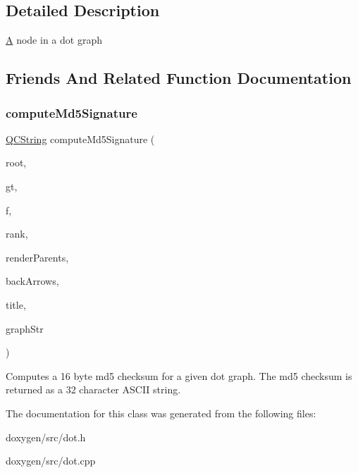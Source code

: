 \subsection{Detailed Description}
\mbox{\hyperlink{class_a}{A}} node in a dot graph 

\subsection{Friends And Related Function Documentation}
\mbox{\label{class_dot_node_a0cd029184c5ab8f66d35ddce33339550}} 
\subsubsection{\texorpdfstring{computeMd5Signature}{computeMd5Signature}}
{\footnotesize\ttfamily \mbox{\hyperlink{class_q_c_string}{Q\+C\+String}} compute\+Md5\+Signature (\begin{DoxyParamCaption}\item[{\mbox{\hyperlink{class_dot_node}{Dot\+Node}} $\ast$}]{root,  }\item[{Dot\+Node\+::\+Graph\+Type}]{gt,  }\item[{Graph\+Output\+Format}]{f,  }\item[{const \mbox{\hyperlink{class_q_c_string}{Q\+C\+String}} \&}]{rank,  }\item[{bool}]{render\+Parents,  }\item[{bool}]{back\+Arrows,  }\item[{const \mbox{\hyperlink{class_q_c_string}{Q\+C\+String}} \&}]{title,  }\item[{\mbox{\hyperlink{class_q_c_string}{Q\+C\+String}} \&}]{graph\+Str }\end{DoxyParamCaption})\hspace{0.3cm}{\ttfamily [friend]}}

Computes a 16 byte md5 checksum for a given dot graph. The md5 checksum is returned as a 32 character A\+S\+C\+II string. 

The documentation for this class was generated from the following files\+:\begin{DoxyCompactItemize}
\item 
doxygen/src/dot.\+h\item 
doxygen/src/dot.\+cpp\end{DoxyCompactItemize}
